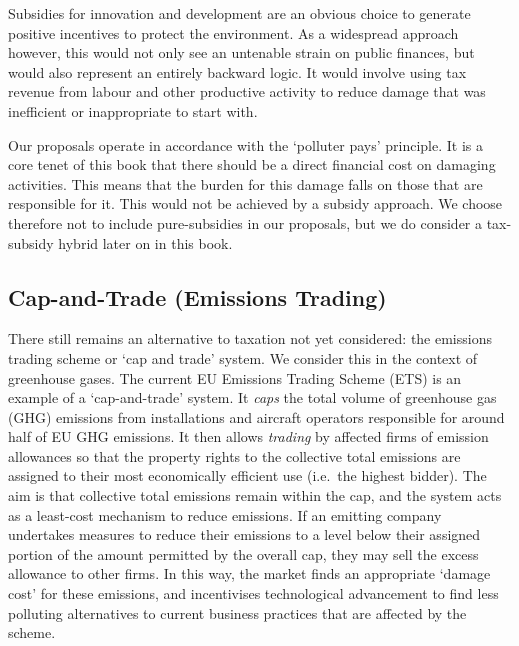 \documentclass[]{tufte-handout}
\begin{document}
Subsidies for innovation and development are an obvious choice to
generate positive incentives to protect the environment. As a widespread
approach however, this would not only see an untenable strain on public
finances, but would also represent an entirely backward logic. It would
involve using tax revenue from labour and other productive activity to
reduce damage that was inefficient or inappropriate to start with.

Our proposals operate in accordance with the `polluter pays' principle.
It is a core tenet of this book that there should be a direct financial
cost on damaging activities. This means that the burden for this damage
falls on those that are responsible for it. This would not be achieved
by a subsidy approach. We choose therefore not to include pure-subsidies
in our proposals, but we do consider a tax-subsidy hybrid later on in
this book.

\hypertarget{cap-and-trade-emissions-trading}{%
\subsection{Cap-and-Trade (Emissions
Trading)}\label{cap-and-trade-emissions-trading}}

There still remains an alternative to taxation not yet considered: the
emissions trading scheme or `cap and trade' system. We consider this in
the context of greenhouse gases. The current EU Emissions Trading Scheme
(ETS) is an example of a `cap-and-trade' system. It \emph{caps} the
total volume of greenhouse gas (GHG) emissions from installations and
aircraft operators responsible for around half of EU GHG emissions. It
then allows \emph{trading} by affected firms of emission allowances so
that the property rights to the collective total emissions are assigned
to their most economically efficient use (i.e.~the highest bidder). The
aim is that collective total emissions remain within the cap, and the
system acts as a least-cost mechanism to reduce emissions. If an
emitting company undertakes measures to reduce their emissions to a
level below their assigned portion of the amount permitted by the
overall cap, they may sell the excess allowance to other firms. In this
way, the market finds an appropriate `damage cost' for these emissions,
and incentivises technological advancement to find less polluting
alternatives to current business practices that are affected by the
scheme.
\end{document}
